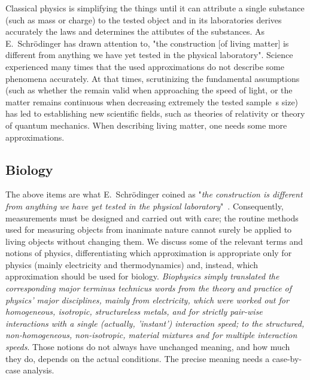 Classical physics is simplifying the things until it can attribute 
a single substance (such as mass or charge) to the tested object
and in its laboratories derives accurately the laws and determines
the attibutes of the substances. As E.~Schrödinger has drawn attention to, "the construction [of living matter] is different from anything we have yet tested in the physical laboratory".
Science experienced many times that the used approximations do not
describe some phenomena accurately. At that times, scrutinizing the 
fundamental assumptions (such as whether the  remain valid when approaching the speed of light,
or the matter remains continuous when decreasing extremely the 
tested sample~s size) has led to establishing new scientific fields,
such as theories of relativity or theory of quantum mechanics.
When describing living matter, one needs some more approximations.




\subsection{Biology\label{sec:Physics-Biology}}

The above items
are what E.~Schr\"odinger coined as "\textit{the construction is different from anything we have yet tested in the physical laboratory}"~\cite{Schrodinger:1992}. Consequently, measurements must be designed and carried out with care; the routine
methods used for measuring objects from inanimate nature
cannot surely be applied to living objects without changing them.  
We discuss some of the relevant terms and notions of physics,
differentiating which approximation is appropriate only for physics (mainly electricity and thermodynamics)
and,  instead, which approximation should be used for biology.
\textit{Biophysics simply translated the corresponding major terminus technicus words
from the theory and practice of physics' major disciplines, mainly from electricity, which were
worked out for homogeneous, isotropic, structureless metals,
and for strictly pair-wise interactions with a single (actually, 'instant') interaction speed; to the structured,
non-homogeneous, non-isotropic, material mixtures and for multiple interaction speeds}.
Those notions do not always have unchanged meaning, and how much they do,
depends on the actual conditions. The precise meaning needs a case-by-case analysis.


